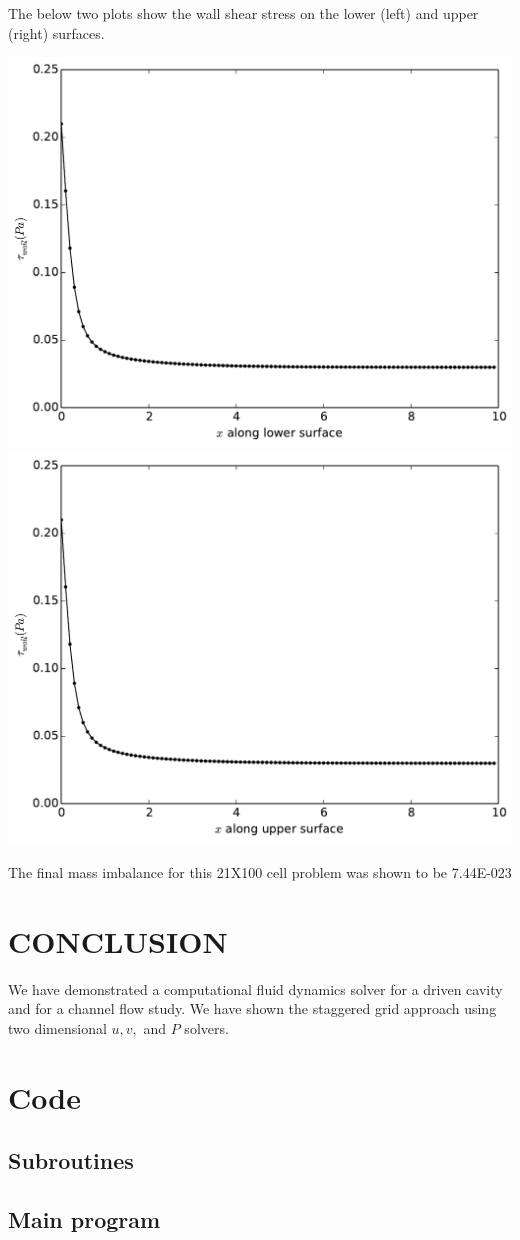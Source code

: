 \documentclass[cleanfoot,cleanhead,onecolumn,12pt,notitlepage]{asme2e}
\begin{document}
The below two plots show the wall shear stress on the lower (left) and upper (right) surfaces.

\includegraphics[width=0.4\linewidth]{../Channel/tau_lower.pdf}
\includegraphics[width=0.4\linewidth]{../Channel/tau_upper.pdf}

The final mass imbalance for this 21X100 cell problem was shown to be 7.44E-023





\section{CONCLUSION}

We have demonstrated a computational fluid dynamics solver for a driven cavity and for a channel flow study.  We have shown the staggered grid approach using two dimensional $u,v,$ and $P$ solvers.


%
%






\appendix

\section{Code}
\label{sec:code}

\subsection{Subroutines}

\subsection{Main program}

\end{document}
